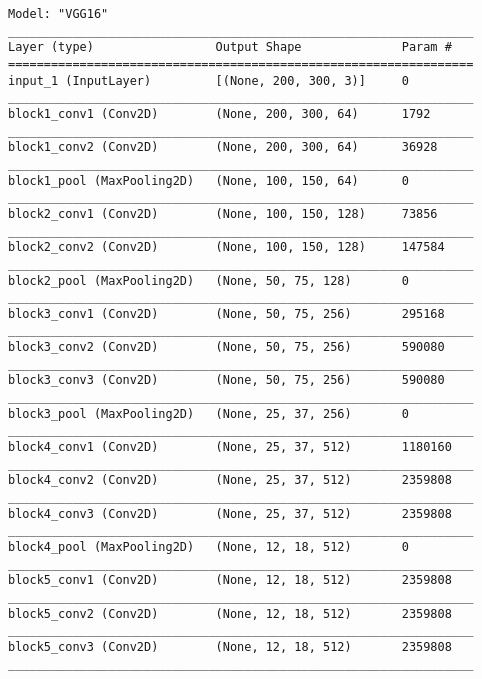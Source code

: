 \begin{verbatim}
Model: "VGG16"
_________________________________________________________________
Layer (type)                 Output Shape              Param #   
=================================================================
input_1 (InputLayer)         [(None, 200, 300, 3)]     0         
_________________________________________________________________
block1_conv1 (Conv2D)        (None, 200, 300, 64)      1792      
_________________________________________________________________
block1_conv2 (Conv2D)        (None, 200, 300, 64)      36928     
_________________________________________________________________
block1_pool (MaxPooling2D)   (None, 100, 150, 64)      0         
_________________________________________________________________
block2_conv1 (Conv2D)        (None, 100, 150, 128)     73856     
_________________________________________________________________
block2_conv2 (Conv2D)        (None, 100, 150, 128)     147584    
_________________________________________________________________
block2_pool (MaxPooling2D)   (None, 50, 75, 128)       0         
_________________________________________________________________
block3_conv1 (Conv2D)        (None, 50, 75, 256)       295168    
_________________________________________________________________
block3_conv2 (Conv2D)        (None, 50, 75, 256)       590080    
_________________________________________________________________
block3_conv3 (Conv2D)        (None, 50, 75, 256)       590080    
_________________________________________________________________
block3_pool (MaxPooling2D)   (None, 25, 37, 256)       0         
_________________________________________________________________
block4_conv1 (Conv2D)        (None, 25, 37, 512)       1180160   
_________________________________________________________________
block4_conv2 (Conv2D)        (None, 25, 37, 512)       2359808   
_________________________________________________________________
block4_conv3 (Conv2D)        (None, 25, 37, 512)       2359808   
_________________________________________________________________
block4_pool (MaxPooling2D)   (None, 12, 18, 512)       0         
_________________________________________________________________
block5_conv1 (Conv2D)        (None, 12, 18, 512)       2359808   
_________________________________________________________________
block5_conv2 (Conv2D)        (None, 12, 18, 512)       2359808   
_________________________________________________________________
block5_conv3 (Conv2D)        (None, 12, 18, 512)       2359808   
_________________________________________________________________

\end{verbatim}

